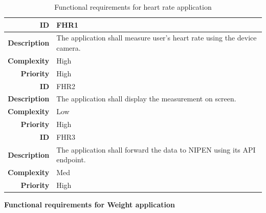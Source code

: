 \begin{table}[h]
\begin{center}
\begin{tabular}{ | r | p{11.5cm} | }
  \hline

  \textbf{ID} & FHR1 \\
  \hline\noalign{\smallskip}\hline
  \textbf{Description}  & The application shall measure user's heart rate using the device camera.\\
  \textbf{Complexity}   & High \\
  \textbf{Priority}     & High \\
  \hline\noalign{\smallskip}\noalign{\smallskip}\hline

  \textbf{ID} & FHR2 \\
  \hline\noalign{\smallskip}\hline
  \textbf{Description}  & The application shall display the measurement on screen. \\
  \textbf{Complexity}   & Low \\
  \textbf{Priority}     & High \\
  \hline\noalign{\smallskip}\noalign{\smallskip}\hline

  \textbf{ID} & FHR3 \\
  \hline\noalign{\smallskip}\hline
  \textbf{Description}  & The application shall forward the data to NIPEN using its API endpoint.\\
  \textbf{Complexity}   & Med \\
  \textbf{Priority}     & High \\
  
  \hline
\end{tabular}
\end{center}
\caption{Functional requirements for heart rate application}
\label{table:reqheartrate}
\end{table}


\textbf{Functional requirements for Weight application}

